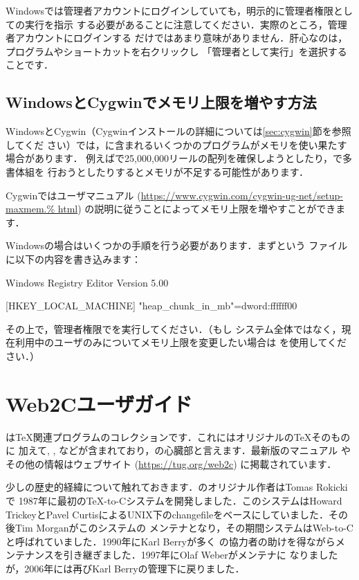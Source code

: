 \documentclass[uplatex,dvipdfmx,tombow]{jsarticle}
\begin{document}
Windowsでは管理者アカウントにログインしていても，明示的に管理者権限としての実行を指示
する必要があることに注意してください．実際のところ，管理者アカウントにログインする
だけではあまり意味がありません．肝心なのは，プログラムやショートカットを右クリックし
「管理者として実行」を選択することです．

\subsection{WindowsとCygwinでメモリ上限を増やす方法}
\label{sec:cygwin-maxmem}

WindowsとCygwin（Cygwinインストールの詳細については\ref{sec:cygwin}節を参照してくだ
さい）では，\TL に含まれるいくつかのプログラムがメモリを使い果たす場合があります．
例えばで25,000,000リールの配列を確保しようとしたり，\LuaTeX で多書体組を
行おうとしたりするとメモリが不足する可能性があります．

Cygwinではユーザマニュアル (\url{https://www.cygwin.com/cygwin-ug-net/setup-maxmem.%
html}) の説明に従うことによってメモリ上限を増やすことができます．

Windowsの場合はいくつかの手順を行う必要があります．まずという
ファイルに以下の内容を書き込みます：
%
\begin{sverbatim}
Windows Registry Editor Version 5.00

[HKEY_LOCAL_MACHINE\Software\Cygwin]
"heap_chunk_in_mb"=dword:ffffff00
\end{sverbatim}
%
その上で，管理者権限でを実行してください．（もし
システム全体ではなく，現在利用中のユーザのみについてメモリ上限を変更したい場合は
を使用してください．）

\section{Web2Cユーザガイド}

\Webc は\TeX 関連プログラムのコレクションです．これにはオリジナルの\TeX そのものに
加えて\MF, \MP, \BibTeX などが含まれており，\TL の心臓部と言えます．最新版のマニュアル
やその他の情報はウェブサイト (\url{https://tug.org/web2c}) に掲載されています．

少し\Webc の歴史的経緯について触れておきます．\Webc のオリジナル作者はTomas Rokickiで
1987年に最初の\TeX -to-Cシステムを開発しました．このシステムはHoward TrickeyとPavel
CurtisによるUNIX下のchangefileをベースにしていました．その後Tim Morganがこのシステムの
メンテナとなり，その期間システムはWeb-to-Cと呼ばれていました．1990年にKarl Berryが多く
の協力者の助けを得ながらメンテナンスを引き継ぎました．1997年にOlaf Weberがメンテナに
なりましたが，2006年には再びKarl Berryの管理下に戻りました．
\end{document}
